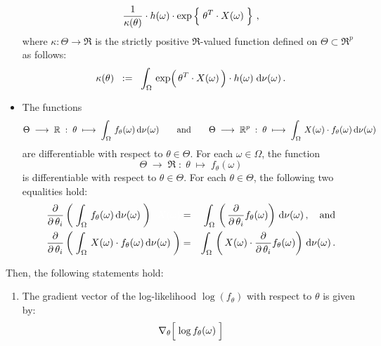 \begin{theorem}
\begin{itemize}
\begin{equation*}
		\dfrac{1}{\kappa(\theta)}
		\cdot
		h(\omega)
		\cdot
		\exp\left\{\; \theta^{T} \!\overset{{\color{white}-}}{\cdot}\! X(\omega) \;\right\}\,,
	\end{equation*}
	where $\kappa : \Theta \longrightarrow \Re$ is the strictly positive
	$\Re$-valued function defined on $\Theta \subset \Re^{p}$ as follows:
	\begin{equation*}
	\kappa(\theta)
	\;\; := \;\;
		\int_{\Omega}\,
			\exp\!\left(\,\theta^{T} \!\overset{{\color{white}-}}{\cdot}\! X(\omega)\,\right) \cdot h(\omega)
		\;\d\nu(\omega)\,.
	\end{equation*}
\item
	The functions
	\begin{equation*}
	\Theta \; \longrightarrow \; \mathbb{R}
	\; : \; \theta \; \longmapsto \; \int_{\Omega}\,f_{\theta}(\omega)\,\textnormal{d}\nu(\omega)
	\quad\quad\textnormal{and}\quad\quad
	\Theta \; \longrightarrow \; \mathbb{R}^{p}
	\; : \; \theta \; \longmapsto \; \int_{\Omega}\,X(\omega) \cdot f_{\theta}(\omega)\,\textnormal{d}\nu(\omega)
	\end{equation*}
	are differentiable with respect to $\theta \in \Theta$.
	For each $\omega \in \Omega$, the function
	\begin{equation*}
	\Theta \; \longrightarrow \; \Re
	\; : \; \theta \; \longmapsto \; f_{\theta}(\omega)
	\end{equation*}
	is differentiable with respect to $\theta \in \Theta$.
	For each $\theta \in \Theta$, the following two equalities hold:
	\begin{eqnarray*}
	\dfrac{\partial}{\partial\,\theta_{i}} \left(\; \int_{\Omega}\,f_{\theta}(\omega)\,\d\nu(\omega) \;\right)
	{\color{white}\;\cdot X(\omega)}
	&=&
	\int_{\Omega}\, \left(\,\dfrac{\partial}{\partial\,\theta_{i}} f_{\theta}(\omega)\right) \,\d\nu(\omega)\,,
	\quad\textnormal{and}
	\\
	\dfrac{\partial}{\partial\,\theta_{i}} \left(\; \int_{\Omega}\,X(\omega) \cdot f_{\theta}(\omega)\,\d\nu(\omega) \;\right)
	&=&
	\int_{\Omega}\, \left(\,X(\omega) \cdot \dfrac{\partial}{\partial\,\theta_{i}} f_{\theta}(\omega)\right) \,\d\nu(\omega)\,.
	\end{eqnarray*}
\end{itemize}
Then, the following statements hold:
\begin{enumerate}
\item
	The gradient vector of the log-likelihood $\log(f_{\theta})$ with respect to $\theta$ is given by:
	\begin{equation*}
	\nabla_{\theta}\!\left[\;\overset{{\color{white}.}}{\log}\,f_{\theta}(\omega)\;\right]

\end{equation*}
\end{enumerate}
\end{theorem}
